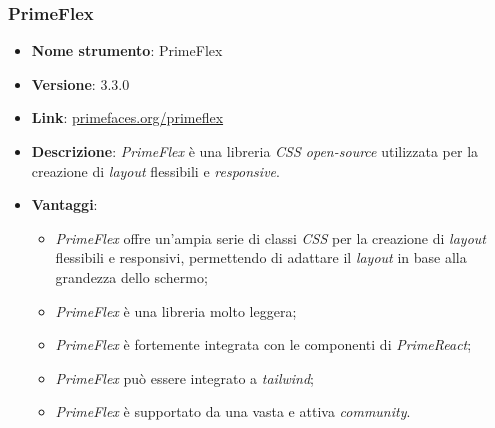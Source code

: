 \subsubsection{PrimeFlex}
\begin{itemize}
    \item \textbf{Nome strumento}: PrimeFlex
    \item \textbf{Versione}: 3.3.0
    \item \textbf{Link}: \href{https://primereact.org/}{primefaces.org/primeflex}
    \item \textbf{Descrizione}: \textit{PrimeFlex} è una libreria \textit{CSS open-source} utilizzata per la creazione di \textit{layout} flessibili e \textit{\gls{responsive}\glox}.
    \item \textbf{Vantaggi}:
          \begin{itemize}
              \item \textit{PrimeFlex} offre un'ampia serie di classi \textit{CSS} per la creazione di \textit{layout} flessibili e responsivi, permettendo di adattare il \textit{layout}
                    in base alla grandezza dello schermo;
              \item \textit{PrimeFlex} è una libreria molto leggera;
              \item \textit{PrimeFlex} è fortemente integrata con le componenti di \textit{PrimeReact};
              \item \textit{PrimeFlex} può essere integrato a \textit{tailwind};
              \item \textit{PrimeFlex} è supportato da una vasta e attiva \textit{community}.
          \end{itemize}
\end{itemize}

